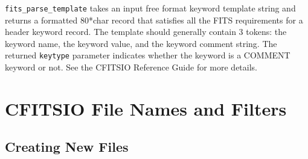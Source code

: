 \documentclass[11pt]{article}
\begin{document}
{\tt fits\_parse\_template} takes an input free format keyword template
string and returns a formatted 80*char record that satisfies all the
FITS requirements for a header keyword record.  The template should
generally contain 3 tokens: the keyword name, the keyword value, and
the keyword comment string.  The returned {\tt keytype} parameter
indicates whether the keyword is a COMMENT keyword or not.   See the
CFITSIO Reference Guide for more details.

\newpage
\section{CFITSIO File Names and Filters}

\subsection{Creating New Files}
\end{document}
